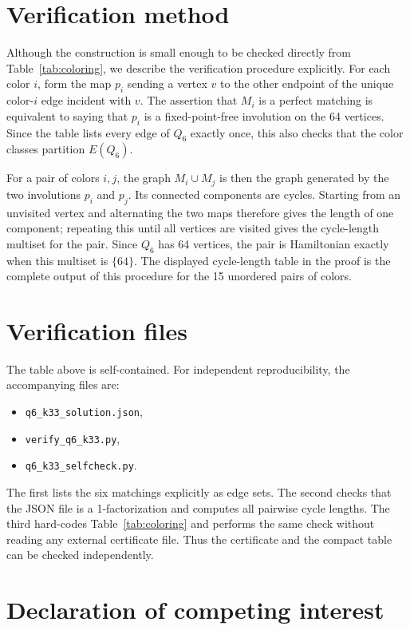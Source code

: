 \documentclass[preprint,12pt]{elsarticle}
\begin{document}
\section{Verification method}

Although the construction is small enough to be checked directly from
Table~\ref{tab:coloring}, we describe the verification procedure explicitly.
For each color \(i\), form the map \(p_i\) sending a vertex \(v\) to the other
endpoint of the unique color-\(i\) edge incident with \(v\). The assertion
that \(M_i\) is a perfect matching is equivalent to saying that \(p_i\) is a
fixed-point-free involution on the 64 vertices. Since the table lists every
edge of \(Q_6\) exactly once, this also checks that the color classes partition
\(E(Q_6)\).

For a pair of colors \(i,j\), the graph \(M_i\cup M_j\) is then the graph
generated by the two involutions \(p_i\) and \(p_j\). Its connected components
are cycles. Starting from an unvisited vertex and alternating the two maps
therefore gives the length of one component; repeating this until all vertices
are visited gives the cycle-length multiset for the pair. Since \(Q_6\) has
64 vertices, the pair is Hamiltonian exactly when this multiset is \(\{64\}\).
The displayed cycle-length table in the proof is the complete output of this
procedure for the 15 unordered pairs of colors.

\section*{Verification files}

The table above is self-contained. For independent reproducibility, the
accompanying files are:
\begin{itemize}
\item \texttt{q6\_k33\_solution.json},
\item \texttt{verify\_q6\_k33.py},
\item \texttt{q6\_k33\_selfcheck.py}.
\end{itemize}
The first lists the six matchings explicitly as edge sets. The second checks
that the JSON file is a 1-factorization and computes all pairwise cycle
lengths. The third hard-codes Table~\ref{tab:coloring} and performs the same
check without reading any external certificate file. Thus the certificate and
the compact table can be checked independently.

\section*{Declaration of competing interest}
\end{document}

